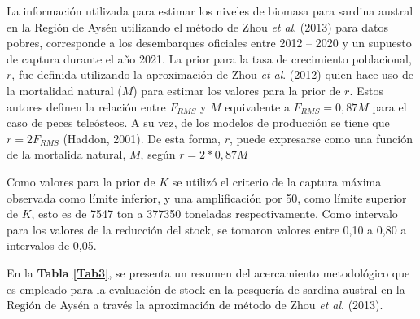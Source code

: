 \documentclass[
  spanish,
]{article}
\begin{document}
\quad

La información utilizada para estimar los niveles de biomasa para
sardina austral en la Región de Aysén utilizando el método de Zhou
\emph{et al}. (2013) para datos pobres, corresponde a los desembarques
oficiales entre 2012 -- 2020 y un supuesto de captura durante el año
2021. La prior para la tasa de crecimiento poblacional, \(r\), fue
definida utilizando la aproximación de Zhou \emph{et al}. (2012) quien
hace uso de la mortalidad natural (\(M\)) para estimar los valores para
la prior de \(r\). Estos autores definen la relación entre \(F_{RMS}\) y
\(M\) equivalente a \(F_{RMS} = 0,87M\) para el caso de peces
teleósteos. A su vez, de los modelos de producción se tiene que
\(r=2F_{RMS}\) (Haddon, 2001). De esta forma, \(r\), puede expresarse
como una función de la mortalida natural, \(M\), según \(r = 2*0,87M\)

Como valores para la prior de \(K\) se utilizó el criterio de la captura
máxima observada como límite inferior, y una amplificación por 50, como
límite superior de \(K\), esto es de 7547 ton a 377350 toneladas
respectivamente. Como intervalo para los valores de la reducción del
stock, se tomaron valores entre 0,10 a 0,80 a intervalos de 0,05.

En la \textbf{Tabla \ref{Tab3}}, se presenta un resumen del acercamiento
metodológico que es empleado para la evaluación de stock en la pesquería
de sardina austral en la Región de Aysén a través la aproximación de
método de Zhou \emph{et al}. (2013).

\vspace{0.8cm}
\end{document}
